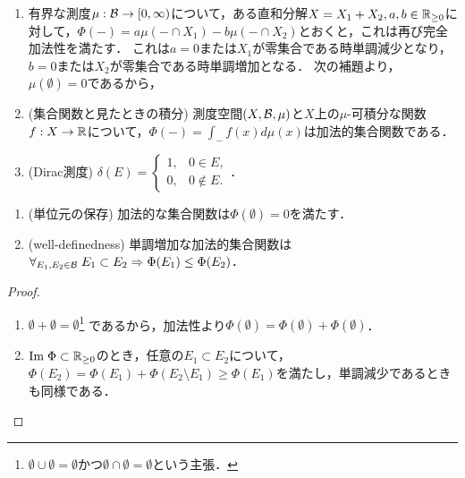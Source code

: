 \documentclass[uplatex, dvipdfmx]{jsreport}
\begin{document}
\begin{example}[加法的集合関数の表現]\mbox{}\label{exp-representation-of-additive-set-function}
    \begin{enumerate}
        \item 有界な測度$\mu:\mathcal{B}\to[0,\infty)$について，ある直和分解$X=X_1+X_2,a,b\in\mathbb{R}_{\ge 0}$に対して，$\Phi(-)=a\mu(-\cap X_1)-b\mu(-\cap X_2)$とおくと，これは再び完全加法性を満たす．
        これは$a=0$または$X_1$が零集合である時単調減少となり，$b=0$または$X_2$が零集合である時単調増加となる．
        次の補題より，$\mu(\emptyset)=0$であるから，
        \item (集合関数と見たときの積分) 測度空間$(X,\mathcal{B},\mu)$と$X$上の$\mu$-可積分な関数$f:X\to\mathbb{R}$について，$\Phi(-)=\int_{-}f(x)d\mu(x)$は加法的集合関数である．
        \item (Dirac測度) $\delta(E)=\begin{cases}1,&0\in E,\\0,&0\notin E.\end{cases}$．
    \end{enumerate}
\end{example}

\begin{lemma}\mbox{}\label{lemma-additive-set-function}
    \begin{enumerate}
        \item (単位元の保存) 加法的な集合関数は$\Phi(\emptyset)=0$を満たす．
        \item (well-definedness) 単調増加な加法的集合関数は$\forall_{E_1,E_2\in\mathcal{B}}\;E_1\subset E_2\Rightarrow\Phi(E_1)\le\Phi(E_2)$．
    \end{enumerate}
\end{lemma}
\begin{proof}\mbox{}
    \begin{enumerate}
        \item $\emptyset+\emptyset=\emptyset$\footnote{$\emptyset\cup\emptyset=\emptyset$かつ$\emptyset\cap\emptyset=\emptyset$という主張．}
        であるから，加法性より$\Phi(\emptyset)=\Phi(\emptyset)+\Phi(\emptyset)$．
        \item $\mathrm{Im}\;\Phi\subset\mathbb{R}_{\ge 0}$のとき，任意の$E_1\subset E_2$について，$\Phi(E_2)=\Phi(E_1)+\Phi(E_2\setminus E_1)\ge\Phi(E_1)$を満たし，単調減少であるときも同様である．
    \end{enumerate}
\end{proof}
\end{document}
